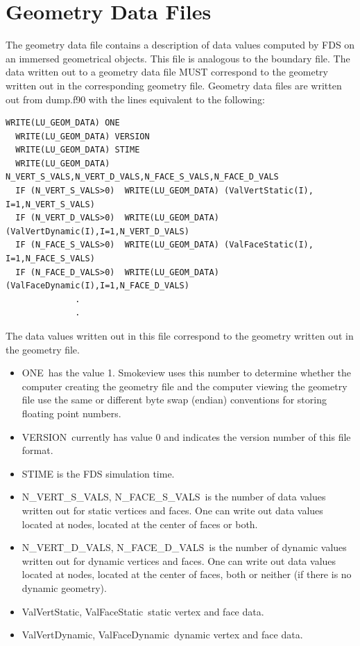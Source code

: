 \documentclass[11pt]{book}
\begin{document}
\section{Geometry Data Files}
\label{out:GEOMETRY_DATA}

The geometry data file contains a description of data values computed by FDS on an immersed
geometrical objects.  This file is analogous to the boundary file.
The data written out to a geometry data file MUST correspond to the geometry written out
in the corresponding geometry file.
Geometry data files are written out from {\ct dump.f90} with the lines equivalent to the following:
\begin{lstlisting}[basicstyle=\scriptsize\ttfamily]
  WRITE(LU_GEOM_DATA) ONE
  WRITE(LU_GEOM_DATA) VERSION
  WRITE(LU_GEOM_DATA) STIME
  WRITE(LU_GEOM_DATA) N_VERT_S_VALS,N_VERT_D_VALS,N_FACE_S_VALS,N_FACE_D_VALS
  IF (N_VERT_S_VALS>0)  WRITE(LU_GEOM_DATA) (ValVertStatic(I), I=1,N_VERT_S_VALS)
  IF (N_VERT_D_VALS>0)  WRITE(LU_GEOM_DATA) (ValVertDynamic(I),I=1,N_VERT_D_VALS)
  IF (N_FACE_S_VALS>0)  WRITE(LU_GEOM_DATA) (ValFaceStatic(I), I=1,N_FACE_S_VALS)
  IF (N_FACE_D_VALS>0)  WRITE(LU_GEOM_DATA) (ValFaceDynamic(I),I=1,N_FACE_D_VALS)
              .
              .
\end{lstlisting}
The data values written out in this file correspond to the geometry written out in the geometry file.
\begin{itemize}
\item {\ct ONE}\ has the value 1. Smokeview uses this number to determine whether the computer creating the geometry file and the computer viewing the geometry file use the same or different byte swap (endian) conventions for storing floating point numbers.
\item {\ct VERSION}\ currently has value 0 and indicates the version number of this file format.
\item {\ct STIME} is the FDS simulation time.
\item {\ct N\_VERT\_S\_VALS, N\_FACE\_S\_VALS}\ is the number of data values written out for static vertices and faces.  One can write out data values located at nodes, located at the center of faces or both.
\item {\ct N\_VERT\_D\_VALS, N\_FACE\_D\_VALS}\ is the number of dynamic values written out for dynamic vertices and faces.  One can write out data values located at nodes, located at the center of faces, both or neither (if there is no dynamic geometry).
\item {\ct ValVertStatic, ValFaceStatic}\ static vertex and face data.
\item {\ct ValVertDynamic, ValFaceDynamic}\ dynamic vertex and face data.
\end{itemize}



\backmatter
\nopart %


\end{document}
